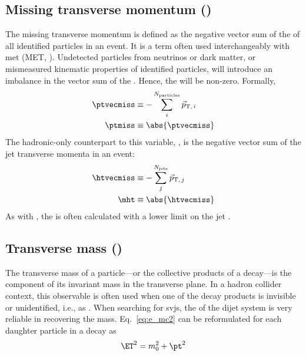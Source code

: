 

\subsection{Missing transverse momentum (\texorpdfstring{\ptvecmiss}{ptmiss})}
\label{subsec:objects_met}

The missing transverse momentum \ptvecmiss is defined as the negative vector sum of the \ptvec of all identified particles in an event. It is a term often used interchangeably with \gls{met} (MET, \VEtmiss). Undetected particles from neutrinos or dark matter, or mismeasured kinematic properties of identified particles, will introduce an imbalance in the vector sum of the \ptvec. Hence, the \ptvecmiss will be non-zero. Formally,
\begin{equation}
    \begin{aligned}
        \ptvecmiss &\equiv - \sum_i^{N_{\mathrm{particles}}} \vec{p}_{\mathrm{T}, \, i} \\
        \ptmiss &\equiv \abs{\ptvecmiss}
    \end{aligned}
    \label{eq:met_definition}
\end{equation}
The hadronic-only counterpart to this variable, \htvecmiss, is the negative vector sum of the \gls{jet} transverse momenta in an event:
\begin{equation}
    \begin{aligned}
        \htvecmiss &\equiv - \sum_j^{N_{\mathrm{jets}}} \vec{p}_{\mathrm{T}, \, j} \\
        \mht &\equiv \abs{\htvecmiss}
    \end{aligned}
    \label{eq:mht_definition}
\end{equation}
As with \HT, the \mht is often calculated with a lower limit on the \gls{jet} \pt.




\subsection{Transverse mass (\texorpdfstring{\mT}{MT})}
\label{subsec:objects_transverse_mass}

The transverse mass \mT of a particle---or the collective products of a decay---is the component of its invariant mass in the transverse plane. In a hadron collider context, this observable is often used when one of the decay products is invisible or unidentified, i.e., as \ptvecmiss. When searching for \glspl{svj}, the \mT of the dijet system is very reliable in recovering the \PZprime mass. Eq.~\ref{eq:e_mc2} can be reformulated for each daughter particle in a decay as
\begin{equation}
\ET^2 = m_0^2 + \pt^2
\label{eq:transverse_energy}
\end{equation}

